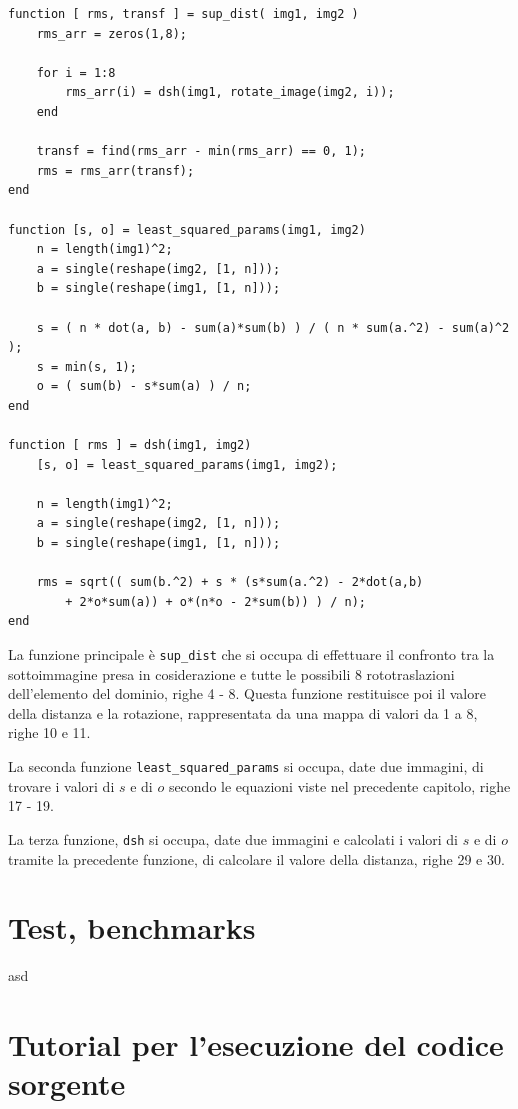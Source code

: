 \documentclass[11pt,a4paper,appendixprefix=true,numbers=noenddot]{scrreprt}
\begin{document}
\begin{verbatim}
function [ rms, transf ] = sup_dist( img1, img2 )
    rms_arr = zeros(1,8);

    for i = 1:8
        rms_arr(i) = dsh(img1, rotate_image(img2, i));
    end

    transf = find(rms_arr - min(rms_arr) == 0, 1);
    rms = rms_arr(transf);
end

function [s, o] = least_squared_params(img1, img2)
    n = length(img1)^2;
    a = single(reshape(img2, [1, n]));
    b = single(reshape(img1, [1, n]));

    s = ( n * dot(a, b) - sum(a)*sum(b) ) / ( n * sum(a.^2) - sum(a)^2 );
    s = min(s, 1);
    o = ( sum(b) - s*sum(a) ) / n;
end

function [ rms ] = dsh(img1, img2)
    [s, o] = least_squared_params(img1, img2);

    n = length(img1)^2;
    a = single(reshape(img2, [1, n]));
    b = single(reshape(img1, [1, n]));

    rms = sqrt(( sum(b.^2) + s * (s*sum(a.^2) - 2*dot(a,b) 
        + 2*o*sum(a)) + o*(n*o - 2*sum(b)) ) / n);
end
\end{verbatim}

La funzione principale è \texttt{sup\_dist} che si occupa di effettuare il confronto tra la sottoimmagine presa in cosiderazione e tutte le possibili 8 rototraslazioni dell'elemento del dominio, righe 4 - 8. Questa funzione restituisce poi il valore della distanza e la rotazione, rappresentata da una mappa di valori da 1 a 8, righe 10 e 11.

La seconda funzione \texttt{least\_squared\_params} si occupa, date due immagini, di trovare i valori di $s$ e di $o$ secondo le equazioni viste nel precedente capitolo, righe 17 - 19.

La terza funzione, \texttt{dsh} si occupa, date due immagini e calcolati i valori di $s$ e di $o$ tramite la precedente funzione, di calcolare il valore della distanza, righe 29 e 30.

\chapter{Test, benchmarks}

asd

\appendix

\chapter{Tutorial per l'esecuzione del codice sorgente}
\end{document}
